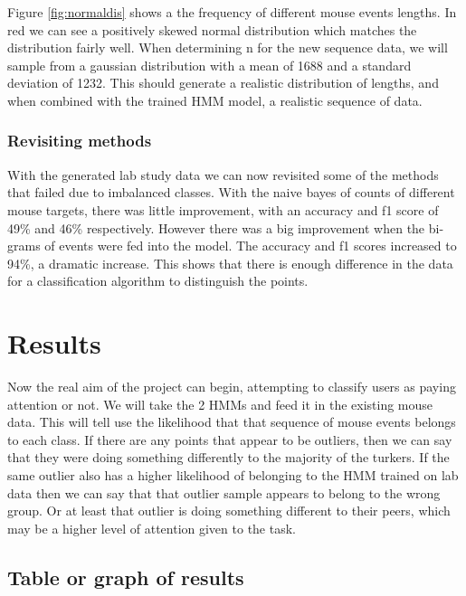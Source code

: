 \documentclass{article}
\begin{document}
Figure \ref{fig:normaldis} shows a the frequency of different mouse events lengths.
In red we can see a positively skewed normal distribution which matches the distribution fairly well.
When determining n for the new sequence data, we will sample from a gaussian distribution with a mean of 1688 and a standard deviation of 1232.
This should generate a realistic distribution of lengths, and when combined with the trained HMM model, a realistic sequence of data.



\subsubsection{Revisiting methods}

With the generated lab study data we can now revisited some of the methods that failed due to imbalanced classes.
With the naive bayes of counts of different mouse targets, there was little improvement, with an accuracy and f1 score of 49\% and 46\% respectively.
However there was a big improvement when the bi-grams of events were fed into the model.
The accuracy and f1 scores increased to 94\%, a dramatic increase.
This shows that there is enough difference in the data for a classification algorithm to distinguish the points. 

\section{Results}

Now the real aim of the project can begin, attempting to classify users as paying attention or not.
We will take the 2 HMMs and feed it in the existing mouse data.
This will tell use the likelihood that that sequence of mouse events belongs to each class.
If there are any points that appear to be outliers, then we can say that they were doing something differently to the majority of the turkers.
If the same outlier also has a higher likelihood of belonging to the HMM trained on lab data then we can say that that outlier sample appears to belong to the wrong group.
Or at least that outlier is doing something different to their peers, which may be a higher level of attention given to the task. 


\subsection{Table or graph of results}
\end{document}
